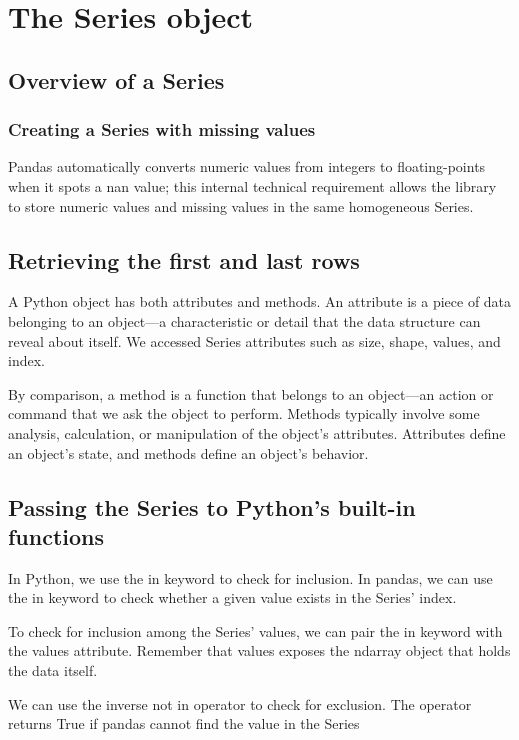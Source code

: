 \chapter{The Series object\label{Ch02}}
\section{Overview of a Series}
\subsection{Creating a Series with missing values}
Pandas automatically converts numeric values from integers to floating-points when it spots a nan value; this internal technical requirement allows the library to store numeric values and missing values in the same homogeneous Series.

\section{Retrieving the first and last rows}
A Python object has both attributes and methods. An attribute is a piece of data belonging to an object—a characteristic or detail that the data structure can reveal about itself. We accessed Series attributes such as size, shape, values, and index.

By comparison, a method is a function that belongs to an object—an action or command that we ask the object to perform. Methods typically involve some analysis, calculation, or manipulation of the object's attributes. Attributes define an object's state, and methods define an object's behavior.

\section{Passing the Series to Python's built-in functions}
In Python, we use the \textsf{in} keyword to check for inclusion. In pandas, we can use the in keyword to check whether a given value exists in the Series' index.

To check for inclusion among the Series' values, we can pair the in keyword with the \textsf{values} attribute. Remember that values exposes the ndarray object that holds the data itself.

We can use the inverse not in operator to check for exclusion. The operator returns True if pandas cannot find the value in the Series